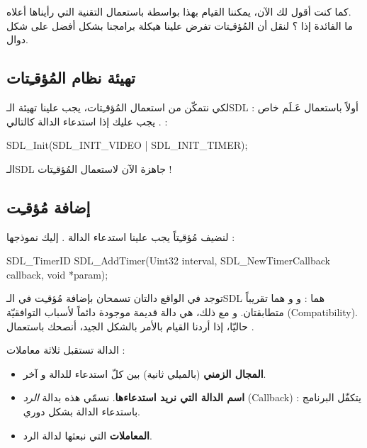 \begin{information}
كما كنت أقول لك الآن، يمكننا القيام بهذا بواسطة
باستعمال التقنية التي رأيناها أعلاه.\\
ما الفائدة إذا ؟ لنقل أن المُؤقـِتات تفرض علينا هيكلة برامجنا بشكل أفضل على شكل دوال.
\end{information}

\subsection{تهيئة نظام المُؤقـِتات}

لكي نتمكّن من استعمال المُؤقـِتات، يجب علينا تهيئة الـ\textenglish{SDL}
أولاً باستعمال عَـلَم خاص :
.
يجب عليك إذا استدعاء الدالة
كالتالي :

\begin{Csource}
SDL_Init(SDL_INIT_VIDEO | SDL_INIT_TIMER);
\end{Csource}

الـ\textenglish{SDL}
جاهزة الآن لاستعمال المُؤقـِتات !

\subsection{إضافة مُؤقـِت}

لنضيف مُؤقـِتاً يجب علينا استدعاء الدالة
.
إليك نموذجها :

\begin{Csource}
SDL_TimerID SDL_AddTimer(Uint32 interval, SDL_NewTimerCallback callback, void *param);
\end{Csource}

توجد في الواقع دالتان تسمحان بإضافة مُؤقـِت في الـ\textenglish{SDL}
هما :
و
و هما تقريباً متطابقتان. و مع ذلك،
هي دالة قديمة موجودة دائماً لأسباب التوافقيّة
(\textenglish{Compatibility}).
حاليّا، إذا أردنا القيام بالأمر بالشكل الجيد، أنصحك باستعمال
.

الدالة تستقبل ثلاثة معاملات :

\begin{itemize}
	\item \textbf{المجال الزمني}
	(بالميلي ثانية) بين كلّ استدعاء للدالة و آخر.
	\item \textbf{اسم الدالة التي نريد استدعاءها}.
	نسمّي هذه بدالة
	\textit{الرد}
	(\textenglish{Callback}) :
	يتكفّل البرنامج باستدعاء الدالة بشكل دوري.
	\item \textbf{المعاملات}
	التي نبعثها لدالة الرد.
\end{itemize}

